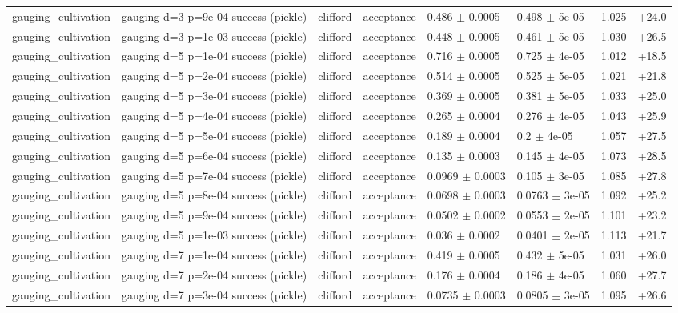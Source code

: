 \documentclass[10pt]{article}
\begin{document}
{\begin{longtable}{l l l l l l r r}
gauging\_cultivation & gauging d=3 p=9e-04 success (pickle) & clifford & acceptance & 0.486 $\pm$ 0.0005 & 0.498 $\pm$ 5e-05 & 1.025 & +24.0 \\
gauging\_cultivation & gauging d=3 p=1e-03 success (pickle) & clifford & acceptance & 0.448 $\pm$ 0.0005 & 0.461 $\pm$ 5e-05 & 1.030 & +26.5 \\
gauging\_cultivation & gauging d=5 p=1e-04 success (pickle) & clifford & acceptance & 0.716 $\pm$ 0.0005 & 0.725 $\pm$ 4e-05 & 1.012 & +18.5 \\
gauging\_cultivation & gauging d=5 p=2e-04 success (pickle) & clifford & acceptance & 0.514 $\pm$ 0.0005 & 0.525 $\pm$ 5e-05 & 1.021 & +21.8 \\
gauging\_cultivation & gauging d=5 p=3e-04 success (pickle) & clifford & acceptance & 0.369 $\pm$ 0.0005 & 0.381 $\pm$ 5e-05 & 1.033 & +25.0 \\
gauging\_cultivation & gauging d=5 p=4e-04 success (pickle) & clifford & acceptance & 0.265 $\pm$ 0.0004 & 0.276 $\pm$ 4e-05 & 1.043 & +25.9 \\
gauging\_cultivation & gauging d=5 p=5e-04 success (pickle) & clifford & acceptance & 0.189 $\pm$ 0.0004 & 0.2 $\pm$ 4e-05 & 1.057 & +27.5 \\
gauging\_cultivation & gauging d=5 p=6e-04 success (pickle) & clifford & acceptance & 0.135 $\pm$ 0.0003 & 0.145 $\pm$ 4e-05 & 1.073 & +28.5 \\
gauging\_cultivation & gauging d=5 p=7e-04 success (pickle) & clifford & acceptance & 0.0969 $\pm$ 0.0003 & 0.105 $\pm$ 3e-05 & 1.085 & +27.8 \\
gauging\_cultivation & gauging d=5 p=8e-04 success (pickle) & clifford & acceptance & 0.0698 $\pm$ 0.0003 & 0.0763 $\pm$ 3e-05 & 1.092 & +25.2 \\
gauging\_cultivation & gauging d=5 p=9e-04 success (pickle) & clifford & acceptance & 0.0502 $\pm$ 0.0002 & 0.0553 $\pm$ 2e-05 & 1.101 & +23.2 \\
gauging\_cultivation & gauging d=5 p=1e-03 success (pickle) & clifford & acceptance & 0.036 $\pm$ 0.0002 & 0.0401 $\pm$ 2e-05 & 1.113 & +21.7 \\
gauging\_cultivation & gauging d=7 p=1e-04 success (pickle) & clifford & acceptance & 0.419 $\pm$ 0.0005 & 0.432 $\pm$ 5e-05 & 1.031 & +26.0 \\
gauging\_cultivation & gauging d=7 p=2e-04 success (pickle) & clifford & acceptance & 0.176 $\pm$ 0.0004 & 0.186 $\pm$ 4e-05 & 1.060 & +27.7 \\
gauging\_cultivation & gauging d=7 p=3e-04 success (pickle) & clifford & acceptance & 0.0735 $\pm$ 0.0003 & 0.0805 $\pm$ 3e-05 & 1.095 & +26.6 \\

\end{longtable}}
\end{document}
